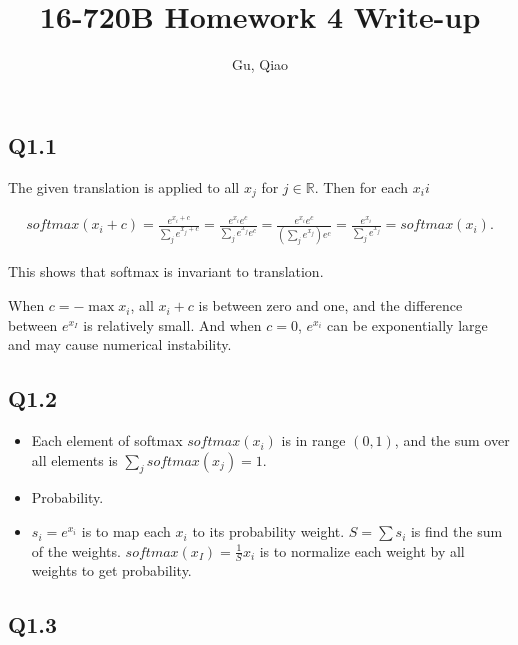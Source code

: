 \documentclass[11pt]{article}
\begin{document}
\author{Gu, Qiao}
\title{16-720B Homework 4 Write-up}
\maketitle

\medskip

\subsection*{Q1.1}

The given translation is applied to all $x_j$ for $j\in \mathbb{R}$. Then for each $x_ii$

\begin{align}
  softmax(x_i+c) = \frac{e^{x_i+c}}{\sum_j e^{x_j+c}} = \frac{e^{x_i}e^c}{\sum_j e^{x_j}e^c}
  = \frac{e^{x_i}e^c}{(\sum_j e^{x_j})e^c} = \frac{e^{x_i}}{\sum_j e^{x_j}} = softmax(x_i).
\end{align}

This shows that softmax is invariant to translation.

When $c=-\max x_i$, all $x_i+c$ is between zero and one, and the difference between $e^{x_I}$ is relatively small. And when $c=0$, $e^{x_i}$ can be exponentially large and may cause numerical instability.

\newpage

\subsection*{Q1.2}

\begin{itemize}
  \item Each element of softmax $softmax(x_i)$ is in range $(0,1)$, and the sum over all elements is $\sum_j softmax(x_j) = 1$.
  \item Probability.
  \item $s_i=e^{x_i}$ is to map each $x_i$ to its probability weight. $S=\sum s_i$ is find the sum of the weights. $softmax(x_I) = \frac{1}{S} x_i$ is to normalize each weight by all weights to get probability.
\end{itemize}

\newpage

\subsection*{Q1.3}

\newcommand{\bx} {\mathbf{x}}
\newcommand{\by} {\mathbf{y}}
\newcommand{\bW} {\mathbf{W}}
\newcommand{\bb} {\mathbf{b}}
\end{document}
